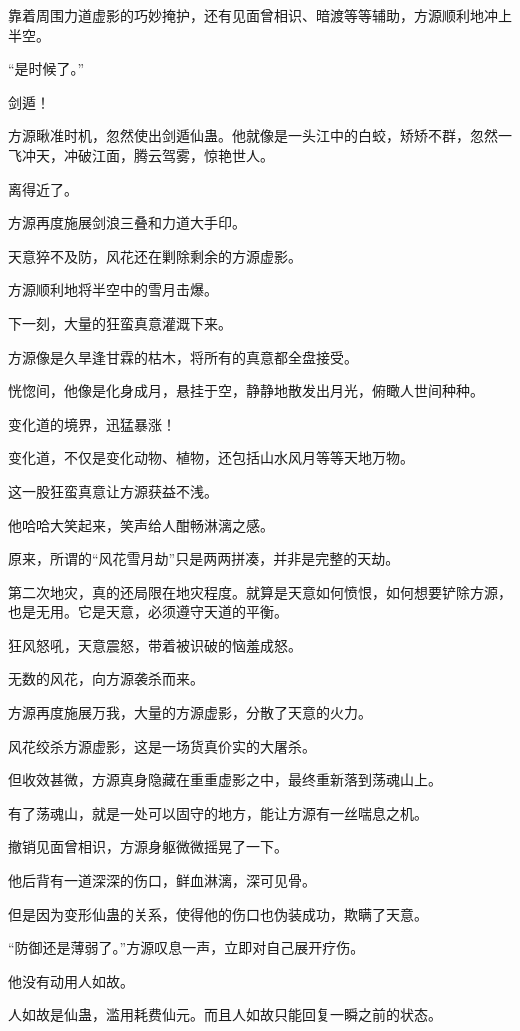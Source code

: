 \begin{this_body}
靠着周围力道虚影的巧妙掩护，还有见面曾相识、暗渡等等辅助，方源顺利地冲上半空。

“是时候了。”

剑遁！

方源瞅准时机，忽然使出剑遁仙蛊。他就像是一头江中的白蛟，矫矫不群，忽然一飞冲天，冲破江面，腾云驾雾，惊艳世人。

离得近了。

方源再度施展剑浪三叠和力道大手印。

天意猝不及防，风花还在剿除剩余的方源虚影。

方源顺利地将半空中的雪月击爆。

下一刻，大量的狂蛮真意灌溉下来。

方源像是久旱逢甘霖的枯木，将所有的真意都全盘接受。

恍惚间，他像是化身成月，悬挂于空，静静地散发出月光，俯瞰人世间种种。

变化道的境界，迅猛暴涨！

变化道，不仅是变化动物、植物，还包括山水风月等等天地万物。

这一股狂蛮真意让方源获益不浅。

他哈哈大笑起来，笑声给人酣畅淋漓之感。

原来，所谓的“风花雪月劫”只是两两拼凑，并非是完整的天劫。

第二次地灾，真的还局限在地灾程度。就算是天意如何愤恨，如何想要铲除方源，也是无用。它是天意，必须遵守天道的平衡。

狂风怒吼，天意震怒，带着被识破的恼羞成怒。

无数的风花，向方源袭杀而来。

方源再度施展万我，大量的方源虚影，分散了天意的火力。

风花绞杀方源虚影，这是一场货真价实的大屠杀。

但收效甚微，方源真身隐藏在重重虚影之中，最终重新落到荡魂山上。

有了荡魂山，就是一处可以固守的地方，能让方源有一丝喘息之机。

撤销见面曾相识，方源身躯微微摇晃了一下。

他后背有一道深深的伤口，鲜血淋漓，深可见骨。

但是因为变形仙蛊的关系，使得他的伤口也伪装成功，欺瞒了天意。

“防御还是薄弱了。”方源叹息一声，立即对自己展开疗伤。

他没有动用人如故。

人如故是仙蛊，滥用耗费仙元。而且人如故只能回复一瞬之前的状态。


\end{this_body}

